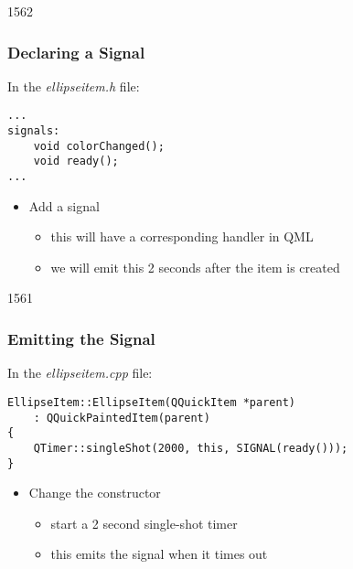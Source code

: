 \begin{slide}[fragile]{1562}\frametitle{Declaring a Signal}

In the \textit{ellipseitem.h} file:

\vspace*{0.5em}
\begin{lstlisting}
...
signals:
    void colorChanged();
    void ready();
...
\end{lstlisting}

\begin{itemize}
\item Add a  signal
  \begin{itemize}
  \item this will have a corresponding  handler in QML
  \item we will emit this 2 seconds after the item is created
  \end{itemize}
\end{itemize}

\end{slide}

\begin{slide}[fragile]{1561}\frametitle{Emitting the Signal}

In the \textit{ellipseitem.cpp} file:

\vspace*{0.5em}
\begin{lstlisting}
EllipseItem::EllipseItem(QQuickItem *parent)
    : QQuickPaintedItem(parent)
{
    QTimer::singleShot(2000, this, SIGNAL(ready()));
}
\end{lstlisting}

\begin{itemize}
\item Change the constructor
  \begin{itemize}
  \item start a 2 second single-shot timer
  \item this emits the  signal when it times out
  \end{itemize}
\end{itemize}

\end{slide}


